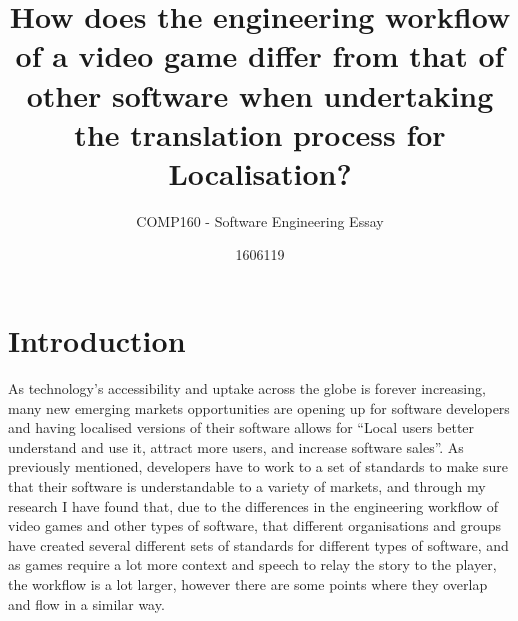 \documentclass{scrartcl}
\title{How does the engineering workflow of a video game differ from that of other software when undertaking the translation process for Localisation?}
\subtitle{COMP160 - Software Engineering Essay}
\author{1606119}
\begin{document}
\maketitle


\section{Introduction}


As technology's accessibility and uptake across the globe is forever increasing, many new emerging markets opportunities are opening up for software developers and having localised versions of their software allows for ``Local users better understand and use it, attract more users, and increase software sales''\cite{6601827}. As previously mentioned, developers have to work to a set of standards to make sure that their software is understandable to a variety of markets, and through my research I have found that, due to the differences in the engineering workflow of video games and other types of software, that different organisations and groups have created several different sets of standards for different types of software, and as games require a lot more context and speech to relay the story to the player, the workflow is a lot larger, however there are some points where they overlap and flow in a similar way. 
\end{document}
